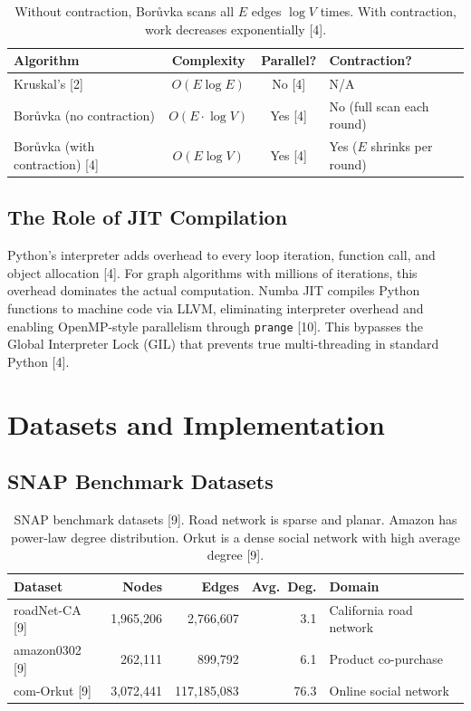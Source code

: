 \documentclass[12pt, a4paper]{article}
\begin{document}
\begin{table}[H]\centering\renewcommand{\arraystretch}{1.2}
\begin{tabular}{lccl}\toprule
\textbf{Algorithm} & \textbf{Complexity} & \textbf{Parallel?} & \textbf{Contraction?} \\\midrule
Kruskal's [2] & $O(E \log E)$ & No [4] & N/A \\
Bor\r{u}vka (no contraction) & $O(E \cdot \log V)$ & Yes [4] & No (full scan each round) \\
Bor\r{u}vka (with contraction) [4] & $O(E \log V)$ & Yes [4] & Yes ($E$ shrinks per round) \\
\bottomrule
\end{tabular}
\caption{Without contraction, Bor\r{u}vka scans all $E$ edges $\log V$ times. With contraction, work decreases exponentially [4].}
\end{table}

\subsection{The Role of JIT Compilation}

Python's interpreter adds overhead to every loop iteration, function call, and object allocation [4]. For graph algorithms with millions of iterations, this overhead dominates the actual computation. Numba JIT compiles Python functions to machine code via LLVM, eliminating interpreter overhead and enabling OpenMP-style parallelism through \texttt{prange} [10]. This bypasses the Global Interpreter Lock (GIL) that prevents true multi-threading in standard Python [4].

\section{Datasets and Implementation}

\subsection{SNAP Benchmark Datasets}

\begin{table}[H]\centering\renewcommand{\arraystretch}{1.2}
\begin{tabular}{lrrrl}\toprule
\textbf{Dataset} & \textbf{Nodes} & \textbf{Edges} & \textbf{Avg.\ Deg.} & \textbf{Domain} \\\midrule
roadNet-CA [9] & 1,965,206 & 2,766,607 & 3.1 & California road network \\
amazon0302 [9] & 262,111 & 899,792 & 6.1 & Product co-purchase \\
com-Orkut [9] & 3,072,441 & 117,185,083 & 76.3 & Online social network \\\bottomrule
\end{tabular}
\caption{SNAP benchmark datasets [9]. Road network is sparse and planar. Amazon has power-law degree distribution. Orkut is a dense social network with high average degree [9].}
\end{table}
\end{document}
